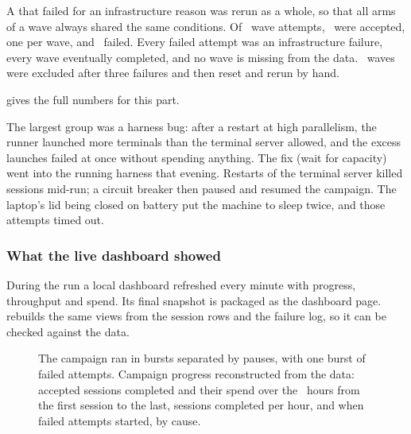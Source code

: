 A  that failed for an infrastructure reason was rerun as a whole, so that all arms of a
wave always shared the same conditions. Of \NAttempts\ wave attempts, \NWaves\ were accepted, one per wave,
and \NFailed\ failed. Every failed attempt was an infrastructure failure, every wave eventually completed,
and no wave is missing from the data. \NWavesReset\ waves were excluded after three failures and then reset
and rerun by hand.

 gives the full numbers for this part.

\begin{table}[tbp]
\centering\small
\caption{Failed wave attempts by cause. For \NFailedInferred\ of them the cause was not recorded at the time
and is inferred from timing.}
\label{vt:tab:failures}

\end{table}

The largest group was a harness bug: after a restart at high parallelism, the runner launched more
terminals than the terminal server allowed, and the excess launches failed at once without spending
anything. The fix (wait for capacity) went into the running harness that evening. Restarts of the terminal
server killed sessions mid-run; a circuit breaker then paused and resumed the campaign. The laptop's lid
being closed on battery put the machine to sleep twice, and those attempts timed out.

\subsubsection{What the live dashboard showed}

During the run a local dashboard refreshed every minute with progress, throughput and spend. Its final snapshot
is packaged as the dashboard page.  rebuilds the same views from the session rows and
the failure log, so it can be checked against the data.

\begin{figure}[tbp]
\centering
{}\par\smallskip

\caption{The campaign ran in bursts separated by pauses, with one burst of failed attempts. Campaign progress reconstructed from the data: accepted sessions completed and their spend over the
\ProgressHours\ hours from the first session to the last, sessions completed per hour, and when failed attempts
started, by cause.}
\label{vt:fig:progress}
\end{figure}

